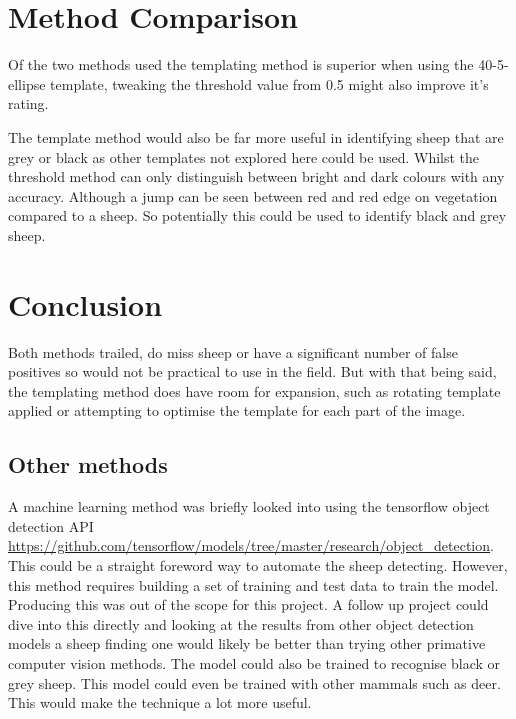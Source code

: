\section{Method Comparison}

Of the two methods used the templating method is superior when using the 40-5-ellipse template, tweaking the threshold value from 0.5 might also improve it's rating. 

The template method would also be far more useful in identifying sheep that are grey or black as other templates not explored here could be used. Whilst the threshold method can only distinguish between bright and dark colours with any accuracy. Although a jump can be seen between red and red edge on vegetation compared to a sheep. So potentially this could be used to identify black and grey sheep.



\section{Conclusion}
Both methods trailed, do miss sheep or have a significant number of false positives so would not be practical to use in the field. But with that being said, the templating method does have room for expansion, such as rotating template applied or attempting to optimise the template for each part of the image.

\subsection{Other methods}

A machine learning method was briefly looked into using the tensorflow object detection API \url{https://github.com/tensorflow/models/tree/master/research/object_detection}. This could be a straight foreword way to automate the sheep detecting. However, this method requires building a set of training and test data to train the model. Producing this was out of the scope for this project. A follow up project could dive into this directly and looking at the results from other object detection models a sheep finding one would likely be better than trying other primative computer vision methods. The model could also be trained to recognise black or grey sheep. This model could even be trained with other mammals such as deer. This would make the technique a lot more useful.